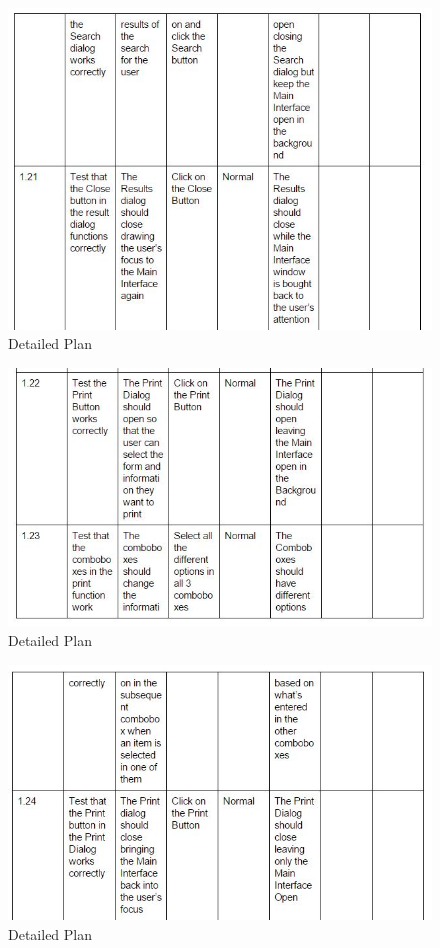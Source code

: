 \begin{itemize}
\begin{figure}[H]
    \includegraphics[width=\textwidth]{DP13.JPG}
    \caption{Detailed Plan} \label{fig:VDetailed Plan}
\end{figure}

\begin{figure}[H]
    \includegraphics[width=\textwidth]{DP14.JPG}
    \caption{Detailed Plan} \label{fig:VDetailed Plan}
\end{figure}

\begin{figure}[H]
    \includegraphics[width=\textwidth]{DP15.JPG}
    \caption{Detailed Plan} \label{fig:VDetailed Plan}
\end{figure}


\end{itemize}
